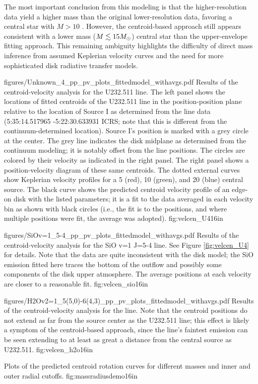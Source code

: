 \documentclass[twocolumn]{aastex61}
\begin{document}
The most important conclusion from this modeling is that the higher-resolution
data yield a higher mass than the original lower-resolution data, favoring
a central star with $M>10$ \msun.  However, the centroid-based approach
still appears consistent with a lower mass ($M\lesssim15M_{\odot}$) central star
than the \citet{Seifried2016a} upper-envelope fitting approach.  This remaining
ambiguity highlights the difficulty of direct mass inference from assumed
Keplerian velocity curves and the need for more sophisticated disk radiative
transfer models.

\Figure
{figures/Unknown_4_pp_pv_plots_fittedmodel_withavgs.pdf}
{Results of the centroid-velocity analysis for the U232.511 line.
The left panel shows the locations of fitted centroids of the U232.511 line in
the position-position plane relative to the location of Source I as determined
from the line data (5:35:14.517965 -5:22:30.633931 ICRS; note that this is
different from the continuum-determined location).  Source I's position is
marked with a grey circle at the center.  The grey line indicates the disk
midplane as determined from the continuum modeling; it is notably offset from
the line positions.  The circles are colored by their velocity as indicated in
the right panel.  The right panel shows a position-velocity diagram of these
same centroids.  The dotted external curves show Keplerian velocity profiles
for a 5 (red), 10 (green), and 20 (blue) \msun central source.  The black
curve shows the predicted centroid velocity profile of an edge-on disk
with the listed parameters; it is a fit to the data averaged in each
velocity bin as shown with black circles (i.e., the fit is to the positions,
and where multiple positions were fit, the average was adopted).
}
{fig:velcen_U4}{1}{6in}

\Figure
{figures/SiOv=1_5-4_pp_pv_plots_fittedmodel_withavgs.pdf}
{Results of the centroid-velocity analysis for the SiO v=1 J=5-4 line.
See Figure \ref{fig:velcen_U4} for details.
Note that the data are quite inconsistent with the disk model;
the SiO emission fitted here traces the bottom of the outflow
and possibly some components of the disk upper atmosphere.
The average positions at each velocity are closer to a reasonable fit.
}
{fig:velcen_sio}{1}{6in}

\Figure
{figures/H2Ov2=1_5(5,0)-6(4,3)_pp_pv_plots_fittedmodel_withavgs.pdf}
{Results of the centroid-velocity analysis for the \water line.
Note that the centroid positions do not extend as far from
the source center as the U232.511 line; this effect is likely
a symptom of the centroid-based approach, since the \water
line's faintest emission can be seen extending to at least as great a distance
from the central source as U232.511.
}
{fig:velcen_h2o}{1}{6in}

{Plots of the predicted centroid rotation curves for different masses
and inner and outer radial cutoffs.}
{fig:massradiusdemo}{1}{6in}

\end{document}
